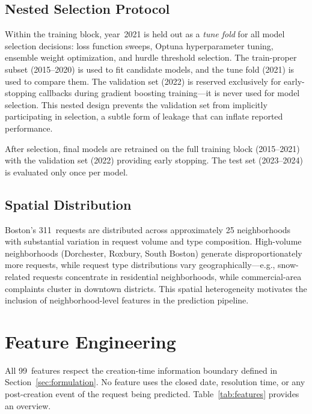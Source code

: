 \documentclass[sigconf,nonacm]{acmart}
\begin{document}
\subsection{Nested Selection Protocol}

Within the training block, year~2021 is held out as a
\emph{tune fold} for all model selection decisions: loss function
sweeps, Optuna hyperparameter tuning, ensemble weight
optimization, and hurdle threshold selection. The train-proper
subset (2015--2020) is used to fit candidate models, and the tune
fold (2021) is used to compare them. The validation set (2022) is
reserved exclusively for early-stopping callbacks during gradient
boosting training---it is never used for model selection. This
nested design prevents the validation set from implicitly
participating in selection, a subtle form of leakage that can
inflate reported performance.

After selection, final models are retrained on the full training
block (2015--2021) with the validation set (2022) providing
early stopping. The test set (2023--2024) is evaluated only once
per model.

\subsection{Spatial Distribution}

Boston's 311~requests are distributed across approximately 25
neighborhoods with substantial variation in request volume and
type composition. High-volume neighborhoods (Dorchester,
Roxbury, South Boston) generate disproportionately more requests,
while request type distributions vary geographically---e.g.,
snow-related requests concentrate in residential neighborhoods,
while commercial-area complaints cluster in downtown districts.
This spatial heterogeneity motivates the inclusion of
neighborhood-level features in the prediction pipeline.

\section{Feature Engineering}
\label{sec:features}

All 99~features respect the creation-time information boundary
defined in Section~\ref{sec:formulation}. No feature uses the
closed date, resolution time, or any post-creation event of the
request being predicted. Table~\ref{tab:features} provides an
overview.
\end{document}

